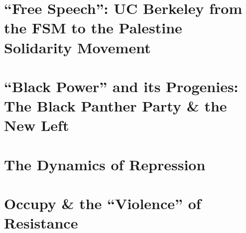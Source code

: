 \documentclass[openany]{book}
\begin{document}
\chapter{``Free Speech'': UC Berkeley from the FSM to the Palestine Solidarity Movement}


\chapter{``Black Power'' and its Progenies: The Black Panther Party \& the New Left}



\chapter{The Dynamics of Repression}




\chapter{Occupy \& the ``Violence'' of Resistance}




\end{document}
